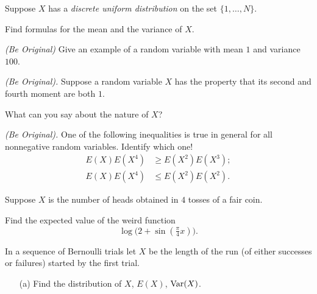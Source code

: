 \begin{problem}[Handout 7, \# 10]
  Suppose \(X\) has a \emph{discrete uniform distribution} on the set
  \(\{1,\dotsc,N\}\).

  \noindent Find formulas for the mean and the variance of \(X\).
\end{problem}
\begin{solution}
\end{solution}

\begin{problem}[Handout 7, \# 11]
  \emph{(Be Original)} Give an example of a random variable with mean \(1\)
  and variance \(100\).
\end{problem}
\begin{solution}
\end{solution}

\begin{problem}[Handout 7, \# 13]
  \emph{(Be Original).} Suppose a random variable \(X\) has the property
  that its second and fourth moment are both \(1\).

  \noindent What can you say about the nature of \(X\)?
\end{problem}
\begin{solution}
\end{solution}
\newpage

\begin{problem}[Handout 7, \# 14]
  \emph{(Be Original).} One of the following inequalities is true in
  general for all nonnegative random variables. Identify which one!
  \begin{align*}
    E(X)E(X^4)&\geq E(X^2)E(X^3);\\
    E(X)E(X^4)&\leq E(X^2)E(X^2).
  \end{align*}
\end{problem}
\begin{solution}
\end{solution}

\begin{problem}[Handout 7, \# 15]
  Suppose \(X\) is the number of heads obtained in \(4\) tosses of a fair
  coin.

  Find the expected value of the weird function
  \[
    \log\bigl( 2+\sin(\tfrac{\pi}{4}x) \bigr).
  \]
\end{problem}
\begin{solution}
\end{solution}

\begin{problem}[Handout 7, \# 16]
  In a sequence of Bernoulli trials let \(X\) be the length of the run (of
  either successes or failures) started by the first trial.
  \begin{itemize}[noitemsep]
  \item[(a)] Find the distribution of \(X\), \(E(X)\), \(\operatorname{Var}(X)\).
  \end{itemize}
\end{problem}
\begin{solution}
\end{solution}

